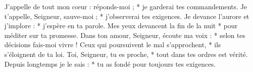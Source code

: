 J’appelle de tout mon cœur : réponds-moi ; *
je garderai tes commandements.
\versseparator
Je t’appelle, Seigneur, sauve-moi ; *
j’observerai tes exigences.
\versseparator
Je devance l’aurore et j’implore : *
j’espère en ta parole.
\versseparator
Mes yeux devancent la fin de la nuit *
pour méditer sur ta promesse.
\versseparator
Dans ton amour, Seigneur, écoute ma voix : *
selon tes décisions fais-moi vivre !
\versseparator
Ceux qui poursuivent le mal s’approchent, *
ils s’éloignent de ta loi.
\versseparator
Toi, Seigneur, tu es proche, *
tout dans tes ordres est vérité.
\versseparator
Depuis longtemps je le sais : *
tu as fondé pour toujours tes exigences.
